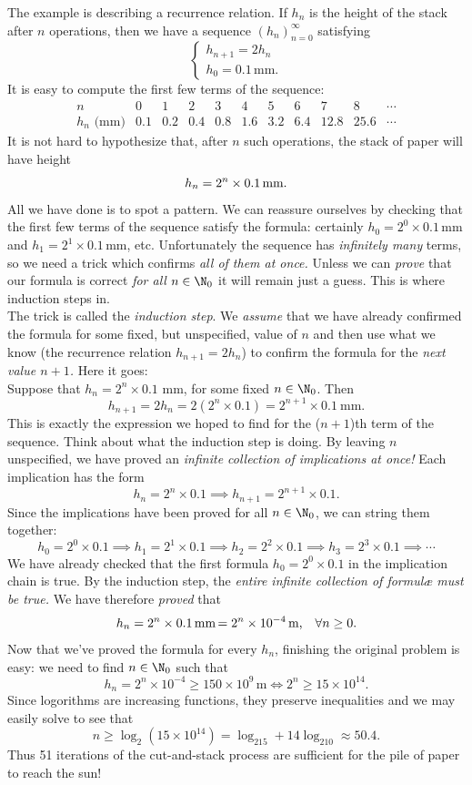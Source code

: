 The example is describing a recurrence relation. If $h_n$ is the height of the stack after $n$ operations, then we have a sequence $(h_n)_{n=0}^\infty$ satisfying
\[\begin{cases}
h_{n+1}=2h_n\\
h_0=0.1\,\text{mm.}
\end{cases}\]
It is easy to compute the first few terms of the sequence:
\[\begin{array}{c|cccccccccc}
n&0&1&2&3&4&5&6&7&8&\cdots\\\hline
h_n\text{ (mm)}&0.1&0.2&0.4&0.8&1.6&3.2&6.4&12.8&25.6&\cdots
\end{array}\]
It is not hard to hypothesize that, after $n$ such operations, the stack of paper will have height
\[h_n=2^n\times 0.1\text{\,mm.}\]
All we have done is to spot a pattern. We can reassure ourselves by checking that the first few terms of the sequence satisfy the formula: certainly $h_0=2^0\times 0.1$\,mm and $h_1=2^1\times 0.1$\,mm, etc. Unfortunately the sequence has \emph{infinitely many} terms, so we need a trick which confirms \emph{all of them at once.} Unless we can \emph{prove} that our formula is correct \emph{for all} $n\in\N_0$ it will remain just a guess. This is where induction steps in.\\

The trick is called the \emph{induction step}. We \emph{assume} that we have already confirmed the formula for some fixed, but unspecified, value of $n$ and then use what we know (the recurrence relation $h_{n+1}=2h_n$) to confirm the formula for the \emph{next value $n+1$.} Here it goes:\\


\quad Suppose that $h_n=2^n\times 0.1$ mm, for some fixed $n\in\N_0$. Then
\[h_{n+1}=2h_n=2(2^n\times 0.1)=2^{n+1}\times 0.1\ \text{mm.}\]
This is exactly the expression we hoped to find for the ($n+1$)th term of the sequence. Think about what the induction step is doing. By leaving $n$ unspecified, we have proved an \emph{infinite collection of implications at once!} Each implication has the form
\[h_n=2^n\times 0.1\implies h_{n+1}=2^{n+1}\times 0.1.\]
Since the implications have been proved for all $n\in\N_0$, we can string them together:
\[h_0=2^0\times 0.1\implies h_{1}=2^{1}\times 0.1\implies h_{2}=2^{2}\times 0.1\implies h_{3}=2^{3}\times 0.1\implies \cdots\]
We have already checked that the first formula $h_0=2^0\times 0.1$ in the implication chain is true. By the induction step, the \emph{entire infinite collection of formulæ must be true.} We have therefore \emph{proved} that
\[h_n=2^n\times 0.1\text{\,mm\,$=2^n\times 10^{-4}$\,m,}\quad \forall n\ge 0.\]
Now that we've proved the formula for every $h_n$, finishing the original problem is easy: we need to find $n\in\N_0$ such that
\[h_n=2^n\times 10^{-4}\ge 150\times 10^9\,\mathrm{m}\iff 2^n\ge 15\times 10^{14}.\]
Since logorithms are increasing functions, they preserve inequalities and we may easily solve to see that
\[n\ge\log_2(15\times 10^{14})=\log_215+14\log_210\approx 50.4.\]
Thus 51 iterations of the cut-and-stack process are sufficient for the pile of paper to reach the sun!\\

